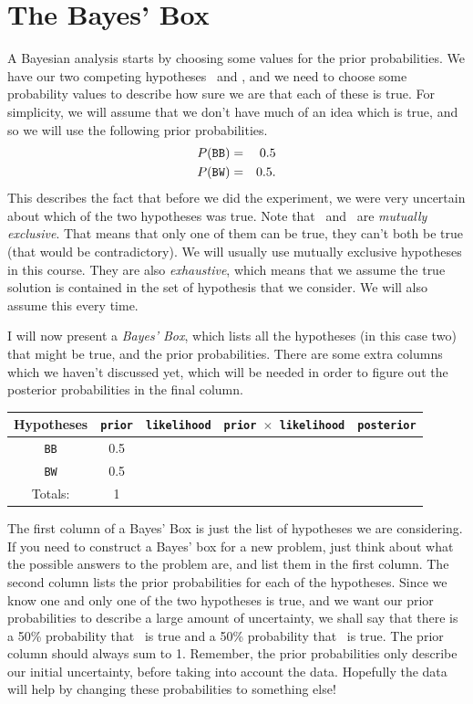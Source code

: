 \section{The Bayes' Box}
A Bayesian analysis starts by choosing some values for the prior probabilities.
We have our two competing hypotheses \bw~and \bb, and we need to choose some
probability values to describe how sure we are that each of these is true.
For simplicity, we will assume that we don't have much of an idea which is true,
and so we will use the following prior probabilities.
\begin{eqnarray}
P(\texttt{BB}) &=& 0.5\\
P(\texttt{BW}) &=& 0.5.
\end{eqnarray}
This describes the fact that before we did the experiment, we were very
uncertain about which of the two hypotheses was true. Note that \bw~and \bb~are
{\it mutually exclusive}. That means that only one of
them can be true, they can't both be true (that would be contradictory). We will
usually use mutually exclusive hypotheses in this course. They are also
{\it exhaustive}, which means that we assume the true solution is contained
in the set of hypothesis that we consider. We will also assume this every time.

I will now present a {\it Bayes' Box}, which lists all the hypotheses (in this
case
two) that might be true, and the prior probabilities. There are some extra
columns which we haven't discussed yet, which will be needed in order to
figure out the posterior probabilities in the final column.
\begin{table}[h!]
\begin{center}
\begin{tabular}{|c|c|c|c|c|}
\hline
{\bf Hypotheses} & {\tt prior} & {\tt likelihood} &
{\tt prior $\times$ likelihood} & {\tt posterior}\\
\hline
{\tt BB} & 0.5 &   &  & \\
{\tt BW} & 0.5 &   &  & \\
\hline
Totals: & 1 & & & \\
\hline
\end{tabular}
\end{center}
\end{table}
The first column of a Bayes' Box is just the list of hypotheses we are
considering. If you need to construct a Bayes' box for a new problem, just think
about what the possible answers to the problem are, and list them in the first
column. The second column lists the prior probabilities for each of the
hypotheses.
Since we know one and only
one of the two hypotheses is true, and we want our prior probabilities to
describe a large amount of uncertainty, we shall say that there is a 50\%
probability that \bb~is true and a 50\% probability that \bw~is true.
The prior column should always sum to 1. Remember, the prior probabilities
only describe our initial uncertainty, before taking into account the
data. Hopefully the data will help by changing these probabilities to
something else!

